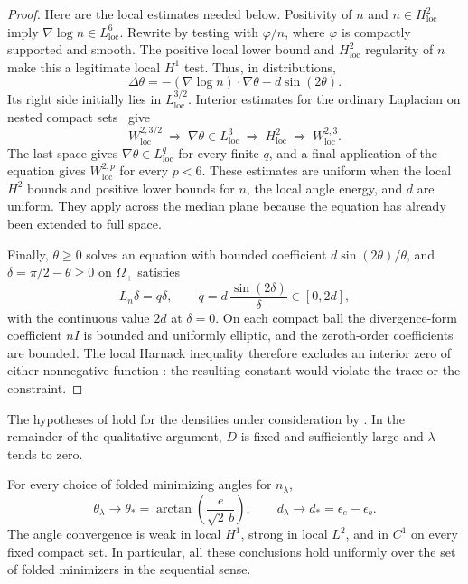 \begin{proof}
Here are the local estimates needed below.  Positivity of \(n\) and
\(n\in H^2_{\mathrm{loc}}\) imply
\(\nabla\log n\in L^6_{\mathrm{loc}}\).  Rewrite
 by testing with \(\varphi/n\), where
\(\varphi\) is compactly supported and smooth.  The positive local
lower bound and \(H^2_{\mathrm{loc}}\) regularity of \(n\) make this
a legitimate local \(H^1\) test.  Thus, in distributions,
\[
 \Delta\theta
   =-(\nabla\log n)\cdot\nabla\theta-d\sin(2\theta).
\]
Its right side initially lies in \(L^{3/2}_{\mathrm{loc}}\).
Interior estimates for the ordinary Laplacian on nested compact
sets~\cite[pp.~6--7]{Yuan19} give
\[
 W^{2,3/2}_{\mathrm{loc}}
 \ \Longrightarrow\ \nabla\theta\in L^3_{\mathrm{loc}}
 \ \Longrightarrow\ H^2_{\mathrm{loc}}
 \ \Longrightarrow\ W^{2,3}_{\mathrm{loc}}.
\]
The last space gives \(\nabla\theta\in L^q_{\mathrm{loc}}\) for every
finite \(q\), and a final application of the equation gives
\(W^{2,p}_{\mathrm{loc}}\) for every \(p<6\).
These estimates are uniform when the local \(H^2\) bounds and positive
lower bounds for \(n\), the local angle energy, and \(d\) are uniform.
They apply across the median plane because the equation has already
been extended to full space.

Finally, \(\theta\ge0\) solves an equation with bounded coefficient
\(d\sin(2\theta)/\theta\), and \(\delta=\pi/2-\theta\ge0\) on
\(\Omega_+\) satisfies
\begin{equation}\label{eq:delta-equation}
 L_n\delta=q\delta,\qquad
 q=d\,\frac{\sin(2\delta)}{\delta}\in[0,2d],
\end{equation}
with the continuous value \(2d\) at \(\delta=0\).
On each compact ball the divergence-form coefficient \(nI\) is
bounded and uniformly elliptic, and the zeroth-order coefficients
are bounded.  The local Harnack inequality therefore excludes an
interior zero of either nonnegative function
\cite[Lecture~17, p.~199, and Lecture~18, Theorem~1]{SimonPDE}:
the resulting constant would violate the trace or the constraint.
\end{proof}

The hypotheses of  hold for the densities
under consideration by
.
In the remainder of the qualitative argument, \(D\) is fixed and
sufficiently large and \(\lambda\) tends to zero.

\begin{proposition}
\label{prop:angle-convergence}
For every choice of folded minimizing angles for \(n_\lambda\),
\begin{equation}\label{eq:angle-convergence}
 \theta_\lambda\longrightarrow
 \theta_*=\arctan\!\left(\frac{e}{\sqrt2\,b}\right),
 \qquad
 d_\lambda\longrightarrow d_*=\epsilon_e-\epsilon_b.
\end{equation}
The angle convergence is weak in local \(H^1\), strong in local
\(L^2\), and in \(C^1\) on every fixed compact set.  In particular,
all these conclusions hold uniformly over the set of folded
minimizers in the sequential sense.
\end{proposition}

